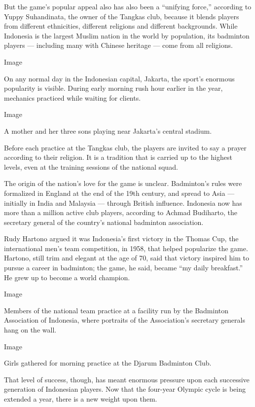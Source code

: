 But the game's popular appeal also has also been a ``unifying force,''
according to Yuppy Suhandinata, the owner of the Tangkas club, because
it blends players from different ethnicities, different religions and
different backgrounds. While Indonesia is the largest Muslim nation in
the world by population, its badminton players --- including many with
Chinese heritage --- come from all religions.

Image

On any normal day in the Indonesian capital, Jakarta, the sport's
enormous popularity is visible. During early morning rush hour earlier
in the year, mechanics practiced while waiting for clients.

Image

A mother and her three sons playing near Jakarta's central stadium.

Before each practice at the Tangkas club, the players are invited to say
a prayer according to their religion. It is a tradition that is carried
up to the highest levels, even at the training sessions of the national
squad.

The origin of the nation's love for the game is unclear. Badminton's
rules were formalized in England at the end of the 19th century, and
spread to Asia --- initially in India and Malaysia --- through British
influence. Indonesia now has more than a million active club players,
according to Achmad Budiharto, the secretary general of the country's
national badminton association.

Rudy Hartono argued it was Indonesia's first victory in the Thomas Cup,
the international men's team competition, in 1958, that helped
popularize the game. Hartono, still trim and elegant at the age of 70,
said that victory inspired him to pursue a career in badminton; the
game, he said, became ``my daily breakfast.'' He grew up to become a
world champion.

Image

Members of the national team practice at a facility run by the Badminton
Association of Indonesia, where portraits of the Association's secretary
generals hang on the wall.

Image

Girls gathered for morning practice at the Djarum Badminton Club.

That level of success, though, has meant enormous pressure upon each
successive generation of Indonesian players. Now that the four-year
Olympic cycle is being extended a year, there is a new weight upon them.


